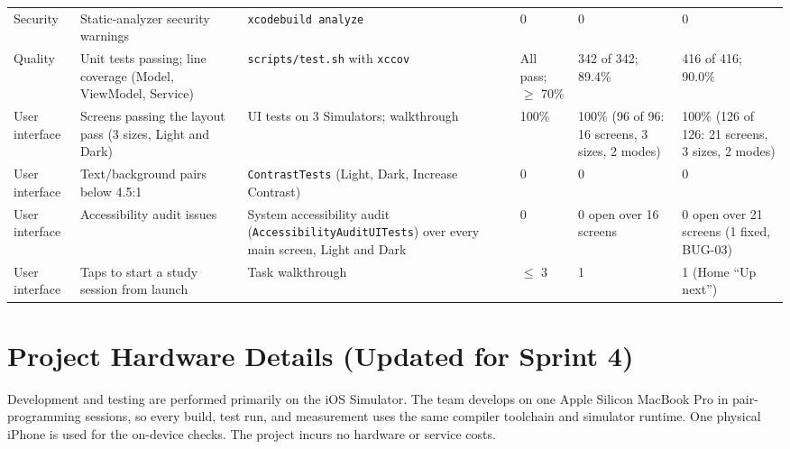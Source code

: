 \documentclass[12pt,letterpaper]{article}
\begin{document}
\begin{xltabular}{\textwidth}{@{}L{1.8cm} L{3.0cm} Y L{1.6cm} L{2.0cm} L{2.2cm}@{}}
Security & Static-analyzer security warnings & \texttt{xcodebuild analyze} & 0 & 0 & 0 \\
Quality & Unit tests passing; line coverage (Model, ViewModel, Service) & \texttt{scripts/test.sh} with \texttt{xccov} & All pass; $\ge$ 70\% & 342 of 342; 89.4\% & 416 of 416; 90.0\% \\
User interface & Screens passing the layout pass (3 sizes, Light and Dark) & UI tests on 3 Simulators; walkthrough & 100\% & 100\% (96 of 96: 16 screens, 3 sizes, 2 modes) & 100\% (126 of 126: 21 screens, 3 sizes, 2 modes) \\
User interface & Text/background pairs below 4.5:1 & \texttt{ContrastTests} (Light, Dark, Increase Contrast) & 0 & 0 & 0 \\
User interface & Accessibility audit issues & System accessibility audit (\texttt{AccessibilityAuditUITests}) over every main screen, Light and Dark & 0 & 0 open over 16 screens & 0 open over 21 screens (1 fixed, BUG-03) \\
User interface & Taps to start a study session from launch & Task walkthrough & $\le$ 3 & 1 & 1 (Home ``Up next'') \\
\end{xltabular}

\section{Project Hardware Details (Updated for Sprint 4)}
Development and testing are performed primarily on the iOS Simulator. The team
develops on one Apple Silicon MacBook Pro in pair-programming sessions, so every
build, test run, and measurement uses the same compiler toolchain and simulator
runtime. One physical iPhone is used for the on-device checks. The
project incurs no hardware or service costs.
\end{document}
